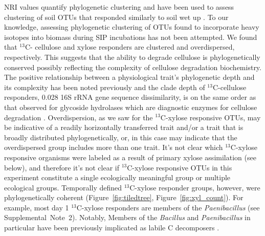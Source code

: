 NRI values quantify phylogenetic clustering \citep{Webb2000} and have 
been used to assess clustering of soil OTUs that responded similarly to soil
wet up \citep{Evans2014a,Placella2012}. To our knowledge, assessing
phylogenetic clustering of OTUs found to incorporate heavy isotopes into
biomass during SIP incubations has not been attempted. We found that $^{13}$C-
cellulose and xylose responders are clustered and overdispersed, respectively.
This suggests that the ability to degrade cellulose is phylogenetically
conserved possibly reflecting the complexity of cellulose degradation
biochemistry. The positive relationship between a physiological trait's
phylogenetic depth and its complexity has been noted previously
\citep{Martiny2013a} and the clade depth of $^{13}$C-cellulose responders,
0.028 16S rRNA gene sequence dissimilarity, is on the same order as that
observed for glycoside hydrolases which are diagnostic enzymes for cellulose
degradation \citep{Berlemont2013}. Overdispersion, as we saw for the
$^{13}$C-xylose responsive OTUs, may be indicative of a readily horizontally
transferred trait and/or a trait that is broadly distributed phylogenetically,
or, in this case may indicate that the overdispersed group includes more than
one trait. It's not clear which $^{13}$C-xylose responsive organisms were
labeled as a result of primary xylose assimilation (see below), and therefore
it's not clear if $^{13}$C-xylose responsive OTUs in this experiment constitute
a single ecologically meaningful group or multiple ecological groups.
Temporally defined $^{13}$C-xylose responder groups, however, were
phylogenetically coherent (Figure~\ref{fig:tiledtree},
Figure~\ref{fig:xyl_count}). For example, most day
1 $^{13}$C-xylose responders are members of the \textit{Paenibacillus}
(see Supplemental~Note~2). Notably, Members of the \textit{Bacillus}
\citep{Cleveland2007} and  \textit{Paenibacillus} in particular
\citep{Verastegui_2014} have been previously implicated as labile
C decomposers .

